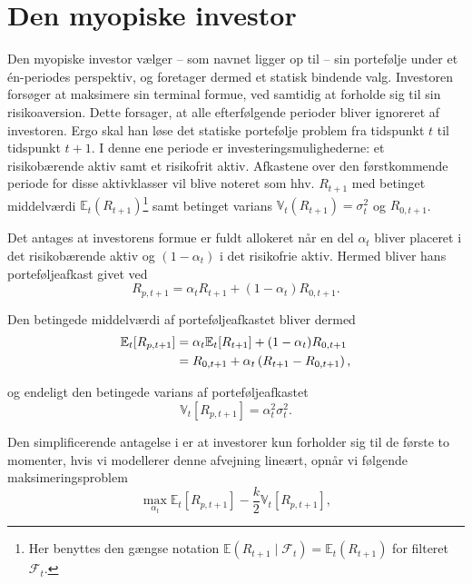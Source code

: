 \documentclass[
  a4paper,
  oneside]{memoir}
\begin{document}
\hypertarget{myoinv}{%
\section{Den myopiske investor}\label{myoinv}}

Den myopiske investor vælger -- som navnet ligger op til -- sin portefølje under et én-periodes perspektiv, og foretager dermed et statisk bindende valg. Investoren forsøger at maksimere sin terminal formue, ved samtidig at forholde sig til sin risikoaversion. Dette forsager, at alle efterfølgende perioder bliver ignoreret af investoren. Ergo skal han løse det statiske portefølje problem fra tidspunkt \(t\) til tidspunkt \(t+1\). I denne ene periode er investeringsmulighederne: et risikobærende aktiv samt et risikofrit aktiv. Afkastene over den førstkommende periode for disse aktivklasser vil blive noteret som hhv. \(R_{t+1}\) med betinget middelværdi \(\mathbb{E}_t(R_{t+1})\)\footnote{Her benyttes den gængse notation \(\mathbb{E}(R_{t+1}\mid \mathcal{F}_t)=\mathbb{E}_t(R_{t+1})\) for filteret \(\mathcal{F}_t\).} samt betinget varians \(\mathbb{V}_t(R_{t+1})=\sigma_t^2\) og \(R_{0,t+1}\).

Det antages at investorens formue er fuldt allokeret når en del \(\alpha_t\) bliver placeret i det risikobærende aktiv og \((1-\alpha_t)\) i det risikofrie aktiv. Hermed bliver hans porteføljeafkast givet ved
\begin{equation}
R_{p,t+1}=\alpha_t R_{t+1}+\left(1-\alpha_t\right)R_{0,t+1}.\label{eq:Portafk}
\end{equation}

Den betingede middelværdi af porteføljeafkastet bliver dermed
\begin{align}
\mathbb{E}_t[R_{p,t+1}]&=\alpha_t\mathbb{E}_t[R_{t+1}]+(1-\alpha_t)R_{0,t+1} \notag\\ 
&=R_{0,t+1}+ \alpha_t\left(R_{t+1} - R_{0,t+1}\right),\label{eq:Forvport}
\end{align}

og endeligt den betingede varians af porteføljeafkastet
\begin{equation}
\mathbb{V}_t[R_{p,t+1}]=\alpha_t^2\sigma_t^2.\label{eq:Varport}
\end{equation}

Den simplificerende antagelse i \citep{Markowitz1952} er at investorer kun forholder sig til de første to momenter, hvis vi modellerer denne afvejning lineært, opnår vi følgende maksimeringsproblem
\begin{equation}
\max_{\alpha_t} \mathbb{E}_t\left[R_{p,t+1}\right] -\frac{k}{2} \mathbb{V}_t\left[R_{p,t+1}\right],\label{eq:Statmaks}
\end{equation}
\end{document}
